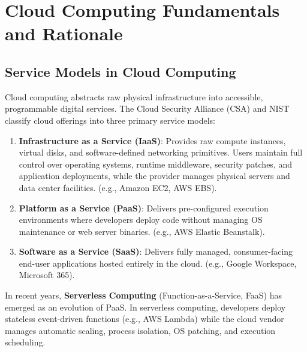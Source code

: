 \chapter{Cloud Computing Fundamentals and Rationale}
\label{chap:cloud_overview}

\section{Service Models in Cloud Computing}
Cloud computing abstracts raw physical infrastructure into accessible, programmable digital services. The Cloud Security Alliance (CSA) and NIST classify cloud offerings into three primary service models:
\begin{enumerate}
    \item \textbf{Infrastructure as a Service (IaaS)}: Provides raw compute instances, virtual disks, and software-defined networking primitives. Users maintain full control over operating systems, runtime middleware, security patches, and application deployments, while the provider manages physical servers and data center facilities. (e.g., Amazon EC2, AWS EBS).
    \item \textbf{Platform as a Service (PaaS)}: Delivers pre-configured execution environments where developers deploy code without managing OS maintenance or web server binaries. (e.g., AWS Elastic Beanstalk).
    \item \textbf{Software as a Service (SaaS)}: Delivers fully managed, consumer-facing end-user applications hosted entirely in the cloud. (e.g., Google Workspace, Microsoft 365).
\end{enumerate}

In recent years, \textbf{Serverless Computing} (Function-as-a-Service, FaaS) has emerged as an evolution of PaaS. In serverless computing, developers deploy stateless event-driven functions (e.g., AWS Lambda) while the cloud vendor manages automatic scaling, process isolation, OS patching, and execution scheduling.

